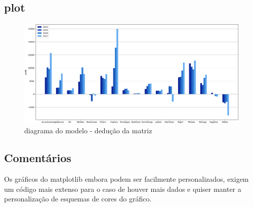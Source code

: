 \subsection*{plot}
\begin{figure}[h]
	\centering
	\includegraphics[width=\textwidth,keepaspectratio]{figures/graph_bar}
	\caption{diagrama do modelo - dedução da matriz}
	\label{lof}
\end{figure}

\subsection*{Comentários}
Os gráficos do matplotlib embora podem ser facilmente personalizados,
exigem um código mais extenso para o caso de houver mais dados e quiser manter a personalização de esquemas de cores do gráfico.